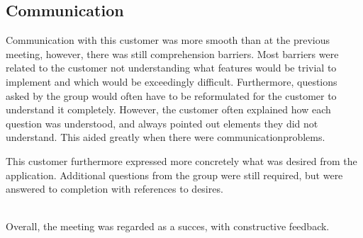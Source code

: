 \subsection{Communication}
Communication with this customer was more smooth than at the previous meeting, however, there was still comprehension barriers.
Most barriers were related to the customer not understanding what features would be trivial to implement and which would be exceedingly difficult.
Furthermore, questions asked by the group would often have to be reformulated for the customer to understand it completely.
However, the customer often explained how each question was understood, and always pointed out elements they did not understand.
This aided greatly when there were communicationproblems.

This customer furthermore expressed more concretely what was desired from the application.
Additional questions from the group were still required, but were answered to completion with references to desires.

\mbox{}\\
Overall, the meeting was regarded as a succes, with constructive feedback.